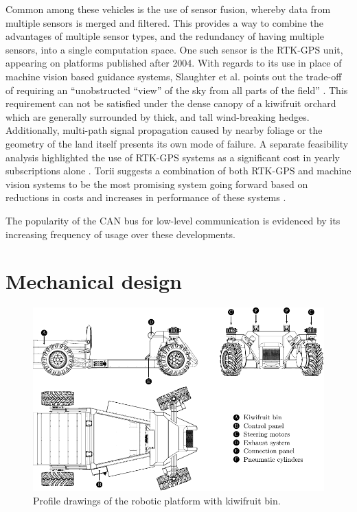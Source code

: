 \documentclass[preprint,authoryear,12pt]{elsarticle}
\begin{document}
    Common among these vehicles is the use of sensor fusion, whereby data from multiple sensors is merged and filtered.
    This provides a way to combine the advantages of multiple sensor types, and the redundancy of having multiple sensors, into a single computation space.
    One such sensor is the RTK-GPS unit, appearing on platforms published after 2004.
    With regards to its use in place of machine vision based guidance systems, Slaughter et al. points out the trade-off of requiring an ``unobstructed ``view'' of the sky from all parts of the field'' \citep{Slaughter2008}.
    This requirement can not be satisfied under the dense canopy of a kiwifruit orchard which are generally surrounded by thick, and tall wind-breaking hedges.
    Additionally, multi-path signal propagation caused by nearby foliage or the geometry of the land itself presents its own mode of failure\cite{Durrant-Whyte2005}.
    A separate feasibility analysis highlighted the use of RTK-GPS systems as a significant cost in yearly subscriptions alone \cite{Pedersen2006}.
    Torii suggests a combination of both RTK-GPS and machine vision systems to be the most promising system going forward based on reductions in costs and increases in performance of these systems \cite{Torii2000}.

    
    The popularity of the CAN bus for low-level communication is evidenced by its increasing frequency of usage over these developments.



\section{Mechanical design}
\label{sect:mechanical}

    \begin{figure}[htbp]
        \centering
        \includegraphics[width=\linewidth]{imgs/profile_views/AMMP-All-Labelled.pdf}
        \caption{Profile drawings of the robotic platform with kiwifruit bin.}
        \label{fig:AMMP}
    \end{figure}
\end{document}
